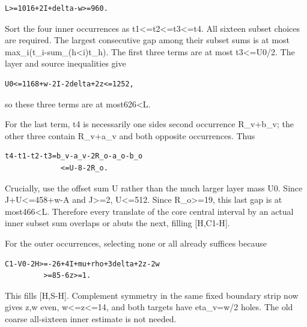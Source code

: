 \documentclass[10pt,a4paper]{article}
\theoremstyle{definition}
\begin{document}
\begin{lstlisting}
L>=1016+2I+delta-w>=960.
\end{lstlisting}

Sort the four inner occurrences as
t1\textless=\allowbreak{}t2\textless=\allowbreak{}t3\textless=\allowbreak{}t4. All sixteen subset choices are
required. The largest consecutive gap among their subset sums is at most
max\_\allowbreak{}i(t\_\allowbreak{}i-sum\_\allowbreak{}(h\textless i)t\_\allowbreak{}h). The first three terms are at most
t3\textless=\allowbreak{}U0/2. The layer and source inequalities give

\begin{lstlisting}
U0<=1168+w-2I-2delta+2z<=1252,
\end{lstlisting}

so these three terms are at most626\textless L.

For the last term,\allowbreak{} t4 is necessarily one side\textquotesingle s second
occurrence R\_\allowbreak{}v+\allowbreak{}b\_\allowbreak{}v; the other three contain R\_\allowbreak{}v+\allowbreak{}a\_\allowbreak{}v and both
opposite occurrences. Thus

\begin{lstlisting}
t4-t1-t2-t3=b_v-a_v-2R_o-a_o-b_o
             <=U-8-2R_o.
\end{lstlisting}

Crucially,\allowbreak{} use the offset sum U rather than the much larger layer mass
U0. Since J+\allowbreak{}U\textless=\allowbreak{}458+\allowbreak{}w-A and J\textgreater=\allowbreak{}2,\allowbreak{} U\textless=\allowbreak{}512.
Since R\_\allowbreak{}o\textgreater=\allowbreak{}19,\allowbreak{} this last gap is at most466\textless L.
Therefore every translate of the core central interval by an actual
inner subset sum overlaps or abuts the next,\allowbreak{} filling {[}H,\allowbreak{}C1-H{]}.

For the outer occurrences,\allowbreak{} selecting none or all already suffices
because

\begin{lstlisting}
C1-V0-2H>=-26+4I+mu+rho+3delta+2z-2w
         >=85-6z>=1.
\end{lstlisting}

This fills {[}H,\allowbreak{}S-H{]}. Complement symmetry in the same fixed boundary
strip now gives z,\allowbreak{}w even,\allowbreak{} w\textless=\allowbreak{}z\textless=\allowbreak{}14,\allowbreak{} and both targets
have eta\_\allowbreak{}v=\allowbreak{}w/2 holes. The old coarse all-sixteen inner estimate is not
needed.
\end{document}
